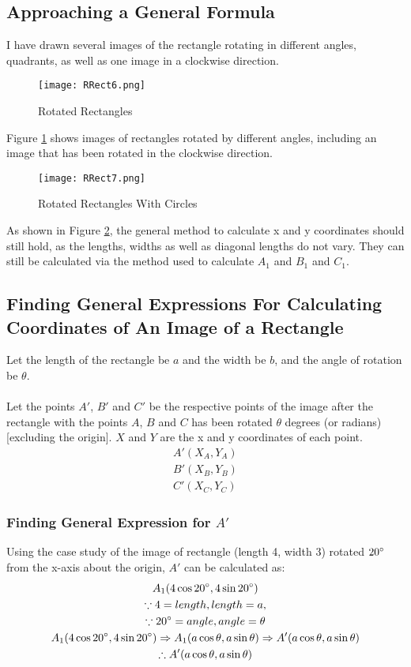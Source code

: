 \documentclass{article}
\begin{document}
        \subsection{Approaching a General Formula} I have drawn several images of the rectangle rotating in different angles, quadrants, as well as one image in a clockwise direction.
        \begin{figure}[h!]
            \texttt{[image: RRect6.png]}
            \caption{Rotated Rectangles}
            \label{fig:rrect6}
        \end{figure} \newpage
        Figure \ref{fig:rrect6} shows images of rectangles rotated by different angles, including an image that has been rotated in the clockwise direction.\newpage
        \begin{figure}[h!]
            \texttt{[image: RRect7.png]}
            \caption{Rotated Rectangles With Circles}
            \label{fig:rrect7}
        \end{figure}
        As shown in Figure \ref{fig:rrect7}, the general method to calculate x and y coordinates should still hold, as the lengths, widths as well as diagonal lengths do not vary. They can still be calculated via the method used to calculate $A_1$ and $B_1$ and $C_1$. \newpage
        \subsection{Finding General Expressions For Calculating Coordinates of An Image of a Rectangle} Let the length of the rectangle be $a$ and the width be $b$, and the angle of rotation be $\theta$. \\\\
        Let the points $A'$, $B'$ and $C'$ be the respective points of the image after the rectangle with the points $A$, $B$ and $C$ has been rotated $\theta$ degrees (or radians) [excluding the origin]. $X$ and $Y$ are the x and y coordinates of each point.
        \begin{align*}
            A'(X_A, Y_A) \\
            B'(X_B, Y_B) \\
            C'(X_C, Y_C)
        \end{align*}
        \subsubsection{Finding General Expression for $A'$} Using the case study of the image of rectangle (length 4, width 3) rotated $20\degree$ from the x-axis about the origin, $A'$ can be calculated as:
        \begin{gather*}
            A_1(4\cos{20\degree}, 4\sin{20\degree}) \\
            \because 4 = length, length = a, \\
            \because 20\degree = angle, angle = \theta \\
            A_1(4\cos{20\degree}, 4\sin{20\degree}) \Rightarrow A_1(a\cos{\theta}, a\sin{\theta}) \Rightarrow A'(a\cos{\theta}, a\sin{\theta}) \\
            \therefore A'(a\cos{\theta}, a\sin{\theta})
        \end{gather*}
\end{document}
